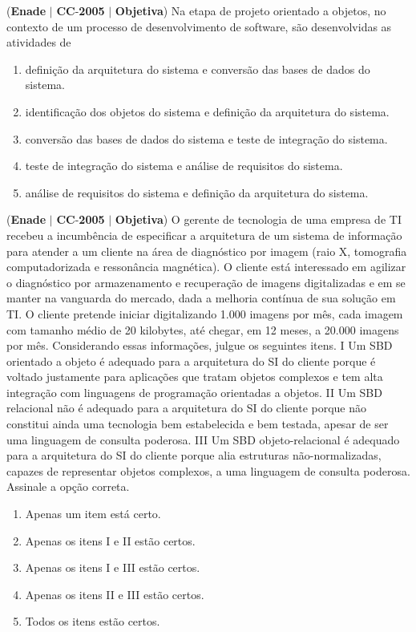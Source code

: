 \documentclass{exam}
\begin{document}
\begin{questions}
\question (\textbf{Enade} $|$ \textbf{CC}-\textbf{2005} $|$ \textbf{Objetiva})
Na etapa de projeto orientado a objetos, no contexto de um
processo de desenvolvimento de software, são desenvolvidas as
atividades de
	\begin{enumerate}[label=\alph*)]
		\item  definição da arquitetura do sistema e conversão das bases de
dados do sistema.
		\item  identificação dos objetos do sistema e definição da
arquitetura do sistema.
		\item  conversão das bases de dados do sistema e teste de
integração do sistema.
		\item  teste de integração do sistema e análise de requisitos do
sistema.
		\item  análise de requisitos do sistema e definição da arquitetura
do sistema.
	\end{enumerate}

\question (\textbf{Enade} $|$ \textbf{CC}-\textbf{2005} $|$ \textbf{Objetiva})
O gerente de tecnologia de uma empresa de TI
recebeu a incumbência de especificar a arquitetura de um
sistema de informação para atender a um cliente na área de
diagnóstico por imagem (raio X, tomografia computadorizada
e ressonância magnética). O cliente está interessado em
agilizar o diagnóstico por armazenamento e recuperação de
imagens digitalizadas e em se manter na vanguarda do
mercado, dada a melhoria contínua de sua solução em TI.
O cliente pretende iniciar digitalizando 1.000 imagens por
mês, cada imagem com tamanho médio de 20 kilobytes, até
chegar, em 12 meses, a 20.000 imagens por mês.
Considerando essas informações, julgue os seguintes itens.
I Um SBD orientado a objeto é adequado para a arquitetura do SI
do cliente porque é voltado justamente para aplicações que
tratam objetos complexos e tem alta integração com linguagens
de programação orientadas a objetos.
II Um SBD relacional não é adequado para a arquitetura do SI do
cliente porque não constitui ainda uma tecnologia bem
estabelecida e bem testada, apesar de ser uma linguagem de
consulta poderosa.
III Um SBD objeto-relacional é adequado para a arquitetura do SI
do cliente porque alia estruturas não-normalizadas, capazes de
representar objetos complexos, a uma linguagem de consulta
poderosa.
Assinale a opção correta.
	\begin{enumerate}[label=\alph*)]
		\item  Apenas um item está certo.
		\item  Apenas os itens I e II estão certos.
		\item  Apenas os itens I e III estão certos.
		\item  Apenas os itens II e III estão certos.
		\item  Todos os itens estão certos.
	\end{enumerate}


\end{questions}
\end{document}
